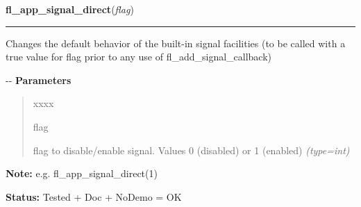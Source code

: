 \hspace{.8\funcindent}\begin{boxedminipage}{\funcwidth}

    \raggedright \textbf{fl\_app\_signal\_direct}(\textit{flag})

    \vspace{-1.5ex}

    \rule{\textwidth}{0.5\fboxrule}
\setlength{\parskip}{2ex}

Changes the default behavior of the built-in signal facilities (to
be called with a true value for flag prior to any use of
fl\_add\_signal\_callback)

-{}-
\setlength{\parskip}{1ex}
      \textbf{Parameters}
      \vspace{-1ex}

      \begin{quote}
        \begin{Ventry}{xxxx}

          \item[flag]


flag to disable/enable signal. Values 0 (disabled) or 1 (enabled)
            {\it (type=int)}

        \end{Ventry}

      \end{quote}

\textbf{Note:} 
e.g. fl\_app\_signal\_direct(1)


\textbf{Status:} 
Tested + Doc + NoDemo = OK


    \end{boxedminipage}

    \label{xformslib:flbasic:fl_add_timeout}

    \vspace{0.5ex}

